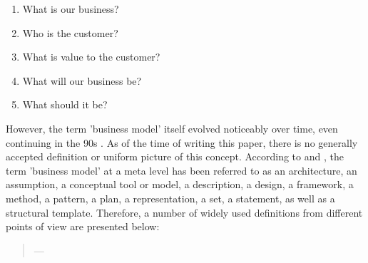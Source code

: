 \begin{enumerate}[parsep=0pt, topsep=0pt, itemsep=0pt]
	\item What is our business?
	\item Who is the customer?
	\item What is value to the customer?
	\item What will our business be?
	\item What should it be?
\end{enumerate}

However, the term 'business model' itself evolved noticeably over time, even continuing in the 90s . As of the time of writing this paper, there is no generally accepted definition or uniform picture of this concept. According to \citet[p. 726]{Morris2005} and \citet[p. 1022]{Zott2011}, the term 'business model' at a meta level has been referred to as an architecture, an assumption, a conceptual tool or model, a description, a design, a framework, a method, a pattern, a plan, a representation, a set, a statement, as well as a structural template. Therefore, a number of widely used definitions from different points of view are presented below:
	
\begin{quotation}\vspace*{-5pt}{\slshape 
[A business model is] an architecture for the product, service and information flows, including a description of the various business actors and their roles; and a description of the potential benefits for the various business actors; and a description of the sources of revenues.}
\vspace*{-7pt}
\begin{flushright}
	--- \citealp[p. 2]{Timmers1998}
\end{flushright}
\end{quotation}


